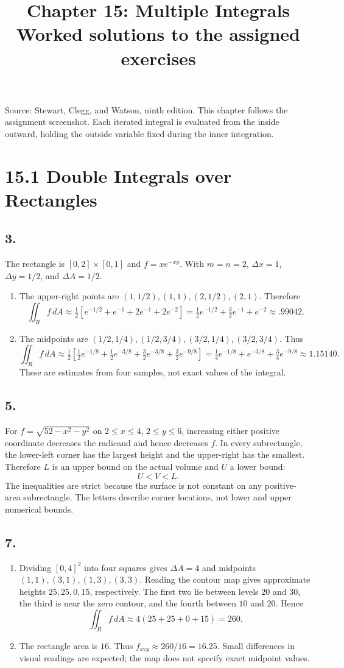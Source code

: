 \documentclass[11pt]{article}
\title{Chapter 15: Multiple Integrals\\Worked solutions to the assigned exercises}
\author{}\date{}
\newcommand{\ex}[1]{\subsection*{#1.}}
\newcommand{\ans}[1]{\boxed{#1}}
\begin{document}
\maketitle
\noindent Source: Stewart, Clegg, and Watson, ninth edition. This chapter follows the assignment screenshot. Each iterated integral is evaluated from the inside outward, holding the outside variable fixed during the inner integration.
\tableofcontents
\clearpage\section*{15.1 Double Integrals over Rectangles}
\ex{3}
The rectangle is $[0,2]\times[0,1]$ and $f=xe^{-xy}$. With $m=n=2$, $\Delta x=1$, $\Delta y=1/2$, and $\Delta A=1/2$.
\begin{enumerate}[label=(\alph*)]
\item The upper-right points are $(1,1/2),(1,1),(2,1/2),(2,1)$. Therefore
\[\iint_R f\,dA\approx\tfrac12[e^{-1/2}+e^{-1}+2e^{-1}+2e^{-2}]
=\ans{\tfrac12e^{-1/2}+\tfrac32e^{-1}+e^{-2}\approx .99042}.\]
\item The midpoints are $(1/2,1/4),(1/2,3/4),(3/2,1/4),(3/2,3/4)$. Thus
\[\iint_R f\,dA\approx\tfrac12[\tfrac12e^{-1/8}+\tfrac12e^{-3/8}+\tfrac32e^{-3/8}+\tfrac32e^{-9/8}]
=\ans{\tfrac14e^{-1/8}+e^{-3/8}+\tfrac34e^{-9/8}\approx1.15140}.\]
These are estimates from four samples, not exact values of the integral.
\end{enumerate}
\ex{5}
For $f=\sqrt{52-x^2-y^2}$ on $2\le x\le4$, $2\le y\le6$, increasing either positive coordinate decreases the radicand and hence decreases $f$. In every subrectangle, the lower-left corner has the largest height and the upper-right has the smallest. Therefore $L$ is an upper bound on the actual volume and $U$ a lower bound:
\[\ans{U<V<L}.\]
The inequalities are strict because the surface is not constant on any positive-area subrectangle. The letters describe corner locations, not lower and upper numerical bounds.
\ex{7}
\begin{enumerate}[label=(\alph*)]
\item Dividing $[0,4]^2$ into four squares gives $\Delta A=4$ and midpoints $(1,1),(3,1),(1,3),(3,3)$. Reading the contour map gives approximate heights $25,25,0,15$, respectively. The first two lie between levels $20$ and $30$, the third is near the zero contour, and the fourth between $10$ and $20$. Hence
\[\ans{\iint_R f\,dA\approx4(25+25+0+15)=260}.\]
\item The rectangle area is $16$. Thus $\ans{f_{\mathrm{avg}}\approx260/16=16.25}$. Small differences in visual readings are expected; the map does not specify exact midpoint values.
\end{enumerate}
\end{document}

